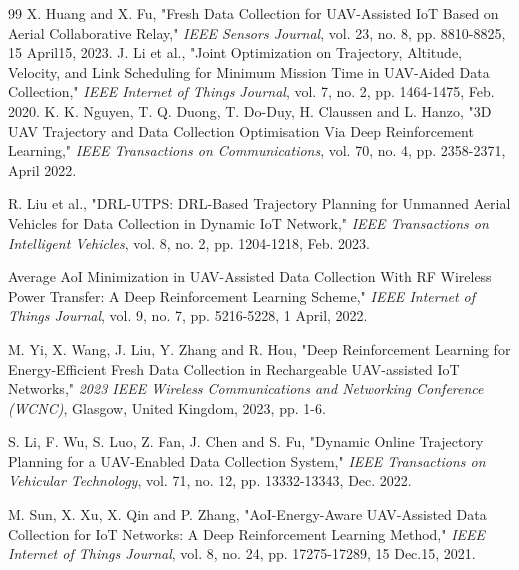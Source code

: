 \documentclass[journal]{IEEEtran}
\begin{document}
\begin{thebibliography}{99}
     X. Huang and X. Fu, "Fresh Data Collection for UAV-Assisted IoT Based on Aerial Collaborative Relay," \textit{IEEE Sensors Journal}, vol. 23, no. 8, pp. 8810-8825, 15 April15, 2023. 
     J. Li et al., "Joint Optimization on Trajectory, Altitude, Velocity, and Link Scheduling for Minimum Mission Time in UAV-Aided Data Collection," \textit{IEEE Internet of Things Journal}, vol. 7, no. 2, pp. 1464-1475, Feb. 2020.
     K. K. Nguyen, T. Q. Duong, T. Do-Duy, H. Claussen and L. Hanzo, "3D UAV Trajectory and Data Collection Optimisation Via Deep Reinforcement Learning," \textit{IEEE Transactions on Communications}, vol. 70, no. 4, pp. 2358-2371, April 2022.
        
     R. Liu et al., "DRL-UTPS: DRL-Based Trajectory Planning for Unmanned Aerial Vehicles for Data Collection in Dynamic IoT Network," \textit{IEEE Transactions on Intelligent Vehicles}, vol. 8, no. 2, pp. 1204-1218, Feb. 2023.
        
     Average AoI Minimization in UAV-Assisted Data Collection With RF Wireless Power Transfer: A Deep Reinforcement Learning Scheme," \textit{IEEE Internet of Things Journal}, vol. 9, no. 7, pp. 5216-5228, 1 April, 2022.
        
     M. Yi, X. Wang, J. Liu, Y. Zhang and R. Hou, "Deep Reinforcement Learning for Energy-Efficient Fresh Data Collection in Rechargeable UAV-assisted IoT Networks," \textit{2023 IEEE Wireless Communications and Networking Conference (WCNC)}, Glasgow, United Kingdom, 2023, pp. 1-6. 
        
     S. Li, F. Wu, S. Luo, Z. Fan, J. Chen and S. Fu, "Dynamic Online Trajectory Planning for a UAV-Enabled Data Collection System," \textit{IEEE Transactions on Vehicular Technology}, vol. 71, no. 12, pp. 13332-13343, Dec. 2022.
        
     M. Sun, X. Xu, X. Qin and P. Zhang, "AoI-Energy-Aware UAV-Assisted Data Collection for IoT Networks: A Deep Reinforcement Learning Method," \textit{IEEE Internet of Things Journal}, vol. 8, no. 24, pp. 17275-17289, 15 Dec.15, 2021.
        
        

\end{thebibliography}
\end{document}
